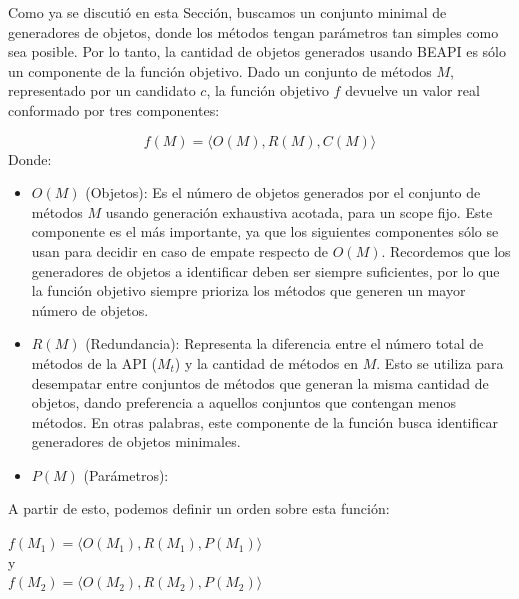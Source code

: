 Como ya se discutió en esta Sección, buscamos un conjunto minimal de generadores de objetos, donde los métodos tengan parámetros tan simples como sea posible. Por lo tanto, la cantidad de objetos generados usando BEAPI es sólo un componente de la función objetivo. Dado un conjunto de métodos $M$, representado por un candidato $c$, la función objetivo $f$ devuelve un valor real conformado por tres componentes:

\[
f(M) = \langle O(M), R(M), C(M) \rangle
\]
Donde:

\begin{itemize}
    \item $O(M)$ (Objetos): Es el número de objetos generados por el conjunto de métodos $M$ usando generación exhaustiva acotada, para un scope fijo. Este componente es el más importante, ya que los siguientes componentes sólo se usan para decidir en caso de empate respecto de $O(M)$. Recordemos que los generadores de objetos a identificar deben ser siempre suficientes, por lo que la función objetivo siempre prioriza los métodos que generen un mayor número de objetos.
    \item $R(M)$ (Redundancia): Representa la diferencia entre el número total de métodos de la API ($M_t$) y la cantidad de métodos en $M$. Esto se utiliza para desempatar entre conjuntos de métodos que generan la misma cantidad de objetos, dando preferencia a aquellos conjuntos que contengan menos métodos. En otras palabras, este componente de la función busca identificar generadores de objetos minimales.
    \item $P(M)$ (Parámetros): 
\end{itemize}


A partir de esto, podemos definir un orden sobre esta función: 

\( f(M_1) = \langle O(M_1), R(M_1), P(M_1) \rangle \) 
\\
y 
\\
\( f(M_2) = \langle O(M_2), R(M_2), P(M_2) \rangle \) 
\newline

